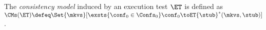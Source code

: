%

\begin{definition}
\label{def:cm}
The \emph{consistency model} induced by an execution test $\ET$ is defined as 
\(
\CMs(\ET) \defeq 
\Set{\mkvs}[ 
\exsts{\conf_0 \in \Confs_0}
\conf_0 \toET{\stub}^{*} (\mkvs, \stub)
]
\).
\end{definition}
%

